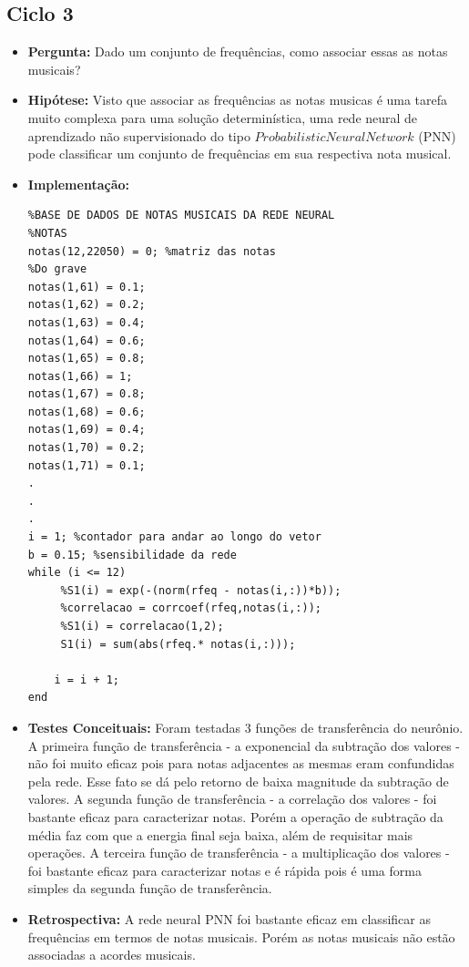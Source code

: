 \subsection{Ciclo 3}
\label{subsec:ciclo_3}
\begin{itemize}
\item \textbf{Pergunta:} Dado um conjunto de frequências, como associar essas as notas musicais?
\item \textbf{Hipótese:} Visto que associar as frequências as notas musicas é uma tarefa muito complexa para uma solução determinística, uma rede neural de aprendizado não supervisionado do tipo $Probabilistic Neural Network$ (PNN) pode classificar um conjunto de frequências em sua respectiva nota musical.
\item \textbf{Implementação:} 
\begin{lstlisting}
%BASE DE DADOS DE NOTAS MUSICAIS DA REDE NEURAL
%NOTAS
notas(12,22050) = 0; %matriz das notas
%Do grave
notas(1,61) = 0.1;
notas(1,62) = 0.2;
notas(1,63) = 0.4;
notas(1,64) = 0.6;
notas(1,65) = 0.8;
notas(1,66) = 1;
notas(1,67) = 0.8;
notas(1,68) = 0.6;
notas(1,69) = 0.4;
notas(1,70) = 0.2;
notas(1,71) = 0.1;
.
.
.
i = 1; %contador para andar ao longo do vetor
b = 0.15; %sensibilidade da rede
while (i <= 12)
     %S1(i) = exp(-(norm(rfeq - notas(i,:))*b));
     %correlacao = corrcoef(rfeq,notas(i,:));
     %S1(i) = correlacao(1,2);    
     S1(i) = sum(abs(rfeq.* notas(i,:)));

    i = i + 1;
end

\end{lstlisting}
\item \textbf{Testes Conceituais:} Foram testadas 3 funções de transferência do neurônio. A primeira função de transferência - a exponencial da subtração dos valores - não foi muito eficaz pois para notas adjacentes as mesmas eram confundidas pela rede. Esse fato se dá pelo retorno de baixa magnitude da subtração de valores. A segunda função de transferência - a correlação dos valores - foi bastante eficaz para caracterizar notas. Porém a operação de subtração da média faz com que a energia final seja baixa, além de requisitar mais operações. A terceira função de transferência - a multiplicação dos valores - foi bastante eficaz para caracterizar notas e é rápida pois é uma forma simples da segunda função de transferência.
\item \textbf{Retrospectiva:} A rede neural PNN foi bastante eficaz em classificar as frequências em termos de notas musicais. Porém as notas musicais não estão associadas a acordes musicais.
\end{itemize}


